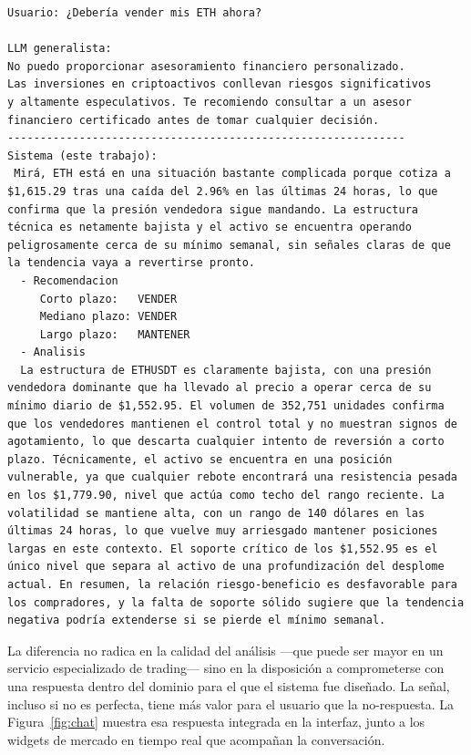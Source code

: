 \documentclass[runningheads]{llncs}
\begin{document}
\begin{lstlisting}[style=chat, float=htbp, label={lst:contraste}, caption={Misma consulta «¿debería vender mis ETH?»: el LLM generalista evade; el sistema se compromete con un veredicto accionable.}]
Usuario: ¿Debería vender mis ETH ahora?

LLM generalista:
No puedo proporcionar asesoramiento financiero personalizado.
Las inversiones en criptoactivos conllevan riesgos significativos
y altamente especulativos. Te recomiendo consultar a un asesor
financiero certificado antes de tomar cualquier decisión.
-------------------------------------------------------------
Sistema (este trabajo):
 Mirá, ETH está en una situación bastante complicada porque cotiza a $1,615.29 tras una caída del 2.96% en las últimas 24 horas, lo que confirma que la presión vendedora sigue mandando. La estructura técnica es netamente bajista y el activo se encuentra operando peligrosamente cerca de su mínimo semanal, sin señales claras de que la tendencia vaya a revertirse pronto.
  - Recomendacion
     Corto plazo:   VENDER
     Mediano plazo: VENDER
     Largo plazo:   MANTENER
  - Analisis
  La estructura de ETHUSDT es claramente bajista, con una presión vendedora dominante que ha llevado al precio a operar cerca de su mínimo diario de $1,552.95. El volumen de 352,751 unidades confirma que los vendedores mantienen el control total y no muestran signos de agotamiento, lo que descarta cualquier intento de reversión a corto plazo. Técnicamente, el activo se encuentra en una posición vulnerable, ya que cualquier rebote encontrará una resistencia pesada en los $1,779.90, nivel que actúa como techo del rango reciente. La volatilidad se mantiene alta, con un rango de 140 dólares en las últimas 24 horas, lo que vuelve muy arriesgado mantener posiciones largas en este contexto. El soporte crítico de los $1,552.95 es el único nivel que separa al activo de una profundización del desplome actual. En resumen, la relación riesgo-beneficio es desfavorable para los compradores, y la falta de soporte sólido sugiere que la tendencia negativa podría extenderse si se pierde el mínimo semanal.
\end{lstlisting}

La diferencia no radica en la calidad del análisis —que puede ser mayor en un servicio
especializado de trading— sino en la disposición a comprometerse con una respuesta dentro
del dominio para el que el sistema fue diseñado. La señal, incluso si no es perfecta, tiene
más valor para el usuario que la no-respuesta. La Figura~\ref{fig:chat} muestra esa
respuesta integrada en la interfaz, junto a los widgets de mercado en tiempo real que
acompañan la conversación.
\end{document}
